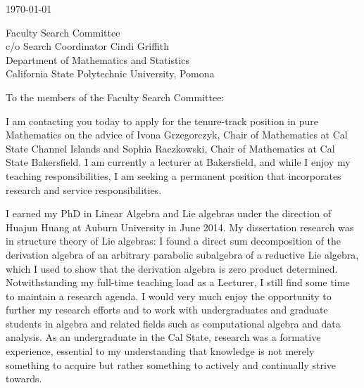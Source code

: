 \documentclass[10pt]{article}
\begin{document}
\makeletterhead

\vfill

\today

\vfill

Faculty Search Committee\\
c/o Search Coordinator Cindi Griffith\\
Department of Mathematics and Statistics\\
California State Polytechnic University, Pomona

\vfill

To the members of the Faculty Search Committee:

\vfill

I am contacting you today to apply for the tenure-track position in pure
Mathematics on the advice of Ivona Grzegorczyk, Chair of Mathematics at
Cal State Channel Islands and Sophia Raczkowski, Chair of Mathematics at
Cal State Bakersfield. I am currently a lecturer at Bakersfield, and
while I enjoy my teaching responsibilities, I am seeking a permanent
position that incorporates research and service responsibilities.

I earned my PhD in Linear Algebra and Lie algebras under the direction
of Huajun Huang at Auburn University in June 2014. My dissertation
research was in structure theory of Lie algebras: I found a direct sum
decomposition of the derivation algebra of an arbitrary parabolic
subalgebra of a reductive Lie algebra, which I used to show that the
derivation algebra is zero product determined. Notwithstanding my
full-time
teaching load as a Lecturer, I still find some time to maintain a
research agenda. I would very much enjoy the opportunity to further my
research efforts and to work with undergraduates and graduate students
in algebra and related fields such as computational algebra and data
analysis. As an undergraduate in the Cal State, research was a formative
experience, essential to my understanding that knowledge is not merely
something to acquire but rather something to actively
and continually strive towards.
\end{document}
